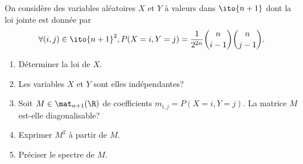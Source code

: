\begin{enonce}
\begin{exercise}[ID={RMS130 E746},subtitle={Mines-Ponts PSI 2019},tags={}]
  On considère des variables aléatoires $X$ et $Y$ à valeurs dans $\ito{n+1}$ dont la loi jointe est donnée par
  \begin{equation*}
    \forall (i,j)\in\ito{n+1}^2, P(X=i, Y=j) = \frac{1}{2^{2n}} \binom{n}{i-1} \binom{n}{j-1}.
  \end{equation*}
\end{exercise}
\begin{enumerate}
  \item Déterminer la loi de $X$.
  \item Les variables $X$ et $Y$ sont elles indépendantes?
  \item Soit $M\in\mat_{n+1}(\R)$ de coefficients $m_{i,j}=P(X=i, Y=j)$.
    La matrice $M$ est-elle diagonalisable?
  \item Exprimer $M^2$ à partir de $M$.
  \item Préciser le spectre de $M$.
\end{enumerate}
\begin{solution}
\end{solution}
\end{enonce}
